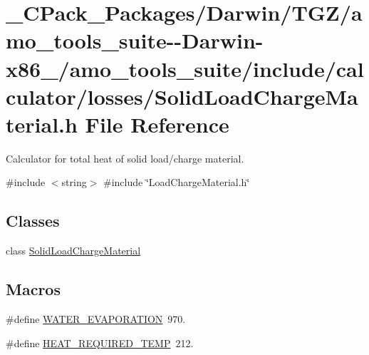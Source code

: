 \hypertarget{___c_pack___packages_2_darwin_2_t_g_z_2amo__tools__suite--_darwin-x86__64_2amo__tools__suite_2inb6bdc51fe912498492e2cc7f9515477d}{}\section{\+\_\+\+C\+Pack\+\_\+\+Packages/\+Darwin/\+T\+G\+Z/amo\+\_\+tools\+\_\+suite-\/-\/\+Darwin-\/x86\+\_/amo\+\_\+tools\+\_\+suite/include/calculator/losses/\+Solid\+Load\+Charge\+Material.h File Reference}
\label{___c_pack___packages_2_darwin_2_t_g_z_2amo__tools__suite--_darwin-x86__64_2amo__tools__suite_2inb6bdc51fe912498492e2cc7f9515477d}


Calculator for total heat of solid load/charge material.  


{\ttfamily \#include $<$string$>$}\newline
{\ttfamily \#include \char`\"{}Load\+Charge\+Material.\+h\char`\"{}}\newline
\subsection*{Classes}
\begin{DoxyCompactItemize}
\item 
class \hyperlink{class_solid_load_charge_material}{Solid\+Load\+Charge\+Material}
\end{DoxyCompactItemize}
\subsection*{Macros}
\begin{DoxyCompactItemize}
\item 
\#define \hyperlink{___c_pack___packages_2_darwin_2_t_g_z_2amo__tools__suite--_darwin-x86__64_2amo__tools__suite_2inb6bdc51fe912498492e2cc7f9515477d_ae92c28c36ccc6a7547c7ed8bd1581061}{W\+A\+T\+E\+R\+\_\+\+E\+V\+A\+P\+O\+R\+A\+T\+I\+ON}~970.
\item 
\#define \hyperlink{___c_pack___packages_2_darwin_2_t_g_z_2amo__tools__suite--_darwin-x86__64_2amo__tools__suite_2inb6bdc51fe912498492e2cc7f9515477d_abbae40352256c3d78028259f5192d4da}{H\+E\+A\+T\+\_\+\+R\+E\+Q\+U\+I\+R\+E\+D\+\_\+\+T\+E\+MP}~212.
\end{DoxyCompactItemize}


